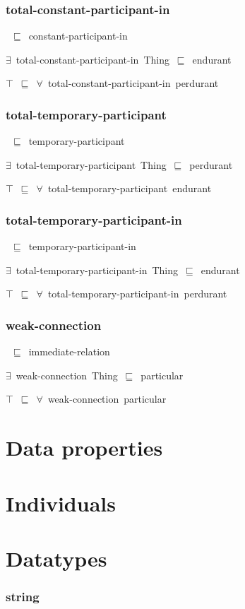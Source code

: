 \documentclass{article}
\begin{document}
\subsubsection*{total-constant-participant-in}

~\ensuremath{\sqsubseteq}~constant-participant-in

\ensuremath{\exists}~total-constant-participant-in~Thing~\ensuremath{\sqsubseteq}~endurant

\ensuremath{\top}~\ensuremath{\sqsubseteq}~\ensuremath{\forall}~total-constant-participant-in~perdurant

\subsubsection*{total-temporary-participant}

~\ensuremath{\sqsubseteq}~temporary-participant

\ensuremath{\exists}~total-temporary-participant~Thing~\ensuremath{\sqsubseteq}~perdurant

\ensuremath{\top}~\ensuremath{\sqsubseteq}~\ensuremath{\forall}~total-temporary-participant~endurant

\subsubsection*{total-temporary-participant-in}

~\ensuremath{\sqsubseteq}~temporary-participant-in

\ensuremath{\exists}~total-temporary-participant-in~Thing~\ensuremath{\sqsubseteq}~endurant

\ensuremath{\top}~\ensuremath{\sqsubseteq}~\ensuremath{\forall}~total-temporary-participant-in~perdurant

\subsubsection*{weak-connection}

~\ensuremath{\sqsubseteq}~immediate-relation

\ensuremath{\exists}~weak-connection~Thing~\ensuremath{\sqsubseteq}~particular

\ensuremath{\top}~\ensuremath{\sqsubseteq}~\ensuremath{\forall}~weak-connection~particular

\section*{Data properties}\section*{Individuals}\section*{Datatypes}\subsubsection*{string}
\end{document}
